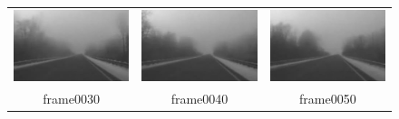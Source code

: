 \documentclass[12pt]{report}
\begin{document}
\begin{figure}[H]
\begin{tabular}{ccc}
	\includegraphics[scale=\videoScale]{images/frame0030.jpg} & \includegraphics[scale=\videoScale]{images/frame0040.jpg} & \includegraphics[scale=\videoScale]{images/frame0050.jpg}\\
	frame0030 & frame0040 & frame0050 \\

\end{tabular}
\end{figure}
\end{document}
